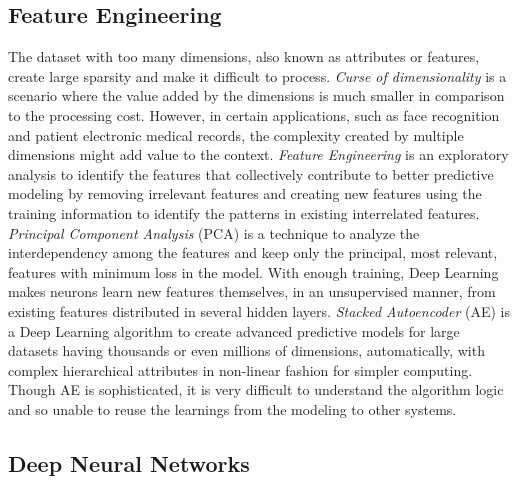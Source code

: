 \documentclass[sigconf]{acmart}
\begin{document}
	\subsection{Feature Engineering}
	
	The dataset with too many dimensions, also known as attributes or features, create large sparsity and make it difficult to process. {\em Curse of dimensionality} is a scenario where the value added by the dimensions is much smaller in comparison to the processing cost. However, in certain applications, such as face recognition and patient electronic medical records, the complexity created by multiple dimensions might add value to the context. {\em Feature Engineering} is an exploratory analysis to identify the features that collectively contribute to better predictive modeling by removing irrelevant features and creating new features using the training information to identify the patterns in existing interrelated features. {\em Principal Component Analysis} (PCA) is a technique to analyze the interdependency among the features and keep only the principal, most relevant, features with minimum loss in the model. With enough training, Deep Learning makes neurons learn new features themselves, in an unsupervised manner, from existing features distributed in several hidden layers. {\em Stacked Autoencoder} (AE) is a Deep Learning algorithm to create advanced predictive models for large datasets having thousands or even millions of dimensions, automatically, with complex hierarchical attributes in non-linear fashion for simpler computing. Though AE is sophisticated, it is very difficult to understand the algorithm logic and so unable to reuse the learnings from the modeling to other systems. 
		
	
	\subsection{Deep Neural Networks}
	
\end{document}
